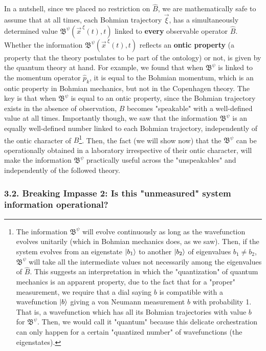 \documentclass[11pt, a4paper]{article} %
\newcommand{\B}{\mathfrak{B}}
\begin{document}
In a nutshell, since we placed no restriction on $\hat{B}$, we are mathematically safe to assume that at all times, each Bohmian trajectory $\vec{\xi}$, has a simultaneously determined value $\B^\psi(\vec{x}^{\:\xi}(t),t)$ linked to {\bf every} observable operator $\hat{B}$. Whether the information $\B^\psi(\vec{x}^{\:\xi}(t),t)$ reflects an \textbf{ontic property} (a property that the theory postulates to be part of the ontology) or not, is given by the quantum theory at hand. For example, we found that when $\B^\psi$ is linked to the momentum operator $\hat{p}_k$, it is equal to the Bohmian momentum, which is an ontic property in Bohmian mechanics, but not in the Copenhagen theory. The key is that when $\B^\psi$ is equal to an ontic property, since the Bohmian trajectory exists in the absence of observation, $B$ becomes "speakable" with a well-defined value at all times. Importantly though, we saw that the information $\B^\psi$ is an equally well-defined number linked to each Bohmian trajectory, independently of the ontic character of $B$\footnote{The information $\B^\psi$ will evolve continuously as long as the wavefunction evolves unitarily (which in Bohmian mechanics does, as we saw). Then, if the system evolves from an eigenstate $\ket{b_1}$ to another $\ket{b_2}$ of eigenvalues $b_1\neq b_2$, $\B^\psi$ will take all the intermediate values not necessarily among the eigenvalues of $\hat{B}$. This suggests an interpretation in which the "quantization" of quantum mechanics is an apparent property, due to the fact that for a "proper" measurement, we require that a dial saying $b$ is compatible with a wavefunction $\ket{b}$ giving a von Neumann measurement $b$ with probability 1. That is, a wavefunction which has all its Bohmian trajectories with value $b$ for $\B^\psi$. Then, we would call it "quantum" because this delicate orchestration can only happen for a certain "quantized number" of wavefunctions (the eigenstates).}. Then, the fact (we will show now) that the $\B^\psi$ can be operationally obtained in a laboratory irrespective of their ontic character, will make the information $\B^\psi$ practically useful across the "unspeakables" and independently of the followed theory.
\vspace{-0.75cm}
 
\subsubsection*{3.2. Breaking Impasse 2: Is this "unmeasured" system information operational?}\vspace{-0.15cm}
\end{document}
